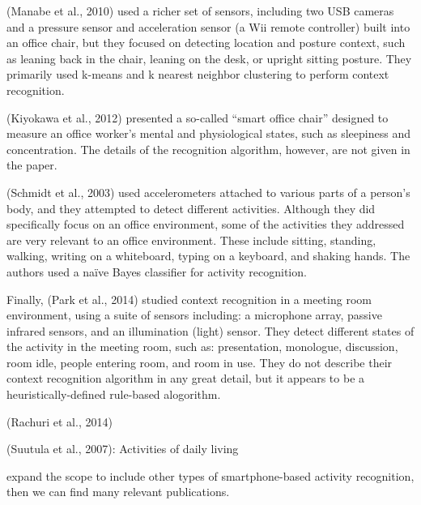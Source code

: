 (Manabe et al., 2010) %
used a richer set of sensors, including two USB cameras and a pressure sensor and acceleration sensor (a Wii remote controller) built into an office chair, but they focused on detecting location and posture context, such as leaning back in the chair, leaning on the desk, or upright sitting posture. They primarily used k-means and k nearest neighbor %
clustering to perform context recognition.

(Kiyokawa et al., 2012) %
presented a so-called ``smart office chair'' designed to measure an office worker's mental and physiological states, such as sleepiness and concentration. The details of the recognition algorithm, however, are not given in the paper.

(Schmidt et al., 2003) %
used accelerometers attached to various parts of a person's body, and they attempted to detect different activities. Although they did specifically focus on an office environment, some of the activities they addressed are very relevant to an office environment. These include sitting, standing, walking, writing on a whiteboard, typing on a keyboard, and shaking hands. The authors used a na\"{i}ve Bayes classifier for activity recognition.

Finally, (Park et al., 2014) %
studied context recognition in a meeting room environment, using a suite of sensors including: a microphone array, passive infrared sensors, and an illumination (light) sensor. They detect different states of the activity in the meeting room, such as: presentation, monologue, discussion, room idle, people entering room, and room in use. They do not describe their context recognition algorithm in any great detail, but it appears to be a heuristically-defined rule-based alogorithm.

(Rachuri et al., 2014)

(Suutula et al., 2007): Activities of daily living

expand the scope to include other types of smartphone-based activity recognition, then we can find many relevant publications.



